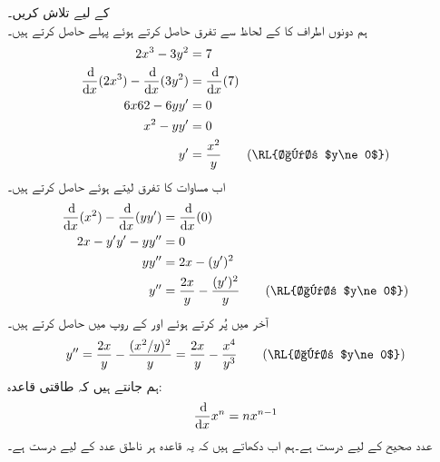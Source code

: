  کے لیے  تلاش کریں۔\\
ہم دونوں اطراف کا  کے لحاظ سے تفرق حاصل کرتے ہوئے پہلے  حاصل کرتے ہیں۔
\begin{align*}
2x^3-3y^2&=7\\
\frac{\dif}{\dif x}(2x^3)-\frac{\dif}{\dif x}(3y^2)&=\frac{\dif}{\dif x}(7)\\
6x62-6yy'&=0\\
x^2-yy'&=0\\
y'&=\frac{x^2}{y}\quad\quad \text{(\RL{اگر $y\ne 0$})}
\end{align*}
 اب مساوات  کا تفرق لیتے ہوئے  حاصل کرتے ہیں۔
\begin{align*}
\frac{\dif}{\dif x}(x^2)-\frac{\dif}{\dif x}(yy')&=\frac{\dif}{\dif x}(0)\\
2x-y'y'-yy''&=0\\
yy''&=2x-(y')^2\\
y''&=\frac{2x}{y}-\frac{(y')^2}{y}\quad\quad \text{(\RL{اگر $y\ne 0$})}
\end{align*}
 آخر میں  پُر کرتے ہوئے  اور  کے روپ میں  حاصل کرتے ہیں۔
\begin{align*}
y''=\frac{2x}{y}-\frac{(x^2/y)^2}{y}=\frac{2x}{y}-\frac{x^4}{y^3}\quad\quad \text{(\RL{اگر $y\ne 0$})}
\end{align*}
ہم  جانتے ہیں کہ طاقتی قاعدہ:
\begin{align*}
\frac{\dif}{\dif x}x^n=nx^{n-1}
\end{align*}
عدد صحیح  کے لیے درست ہے۔ہم اب دکھاتے ہیں کہ یہ قاعدہ  ہر ناطق عدد کے لیے درست ہے۔

